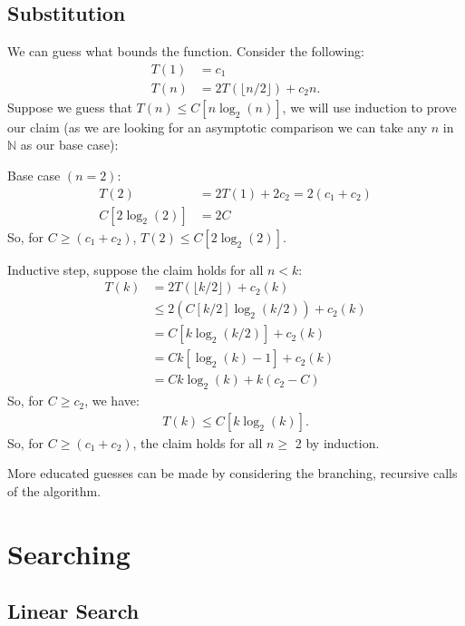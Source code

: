 \documentclass[a4paper, 12pt, twoside]{article}
\begin{document}
\subsection{Substitution}

We can guess what bounds the function. Consider the following:
\begin{align*}
      T(1) &= c_1 \\
      T(n) &= 2T(\lfloor n / 2 \rfloor) + c_2n.
\end{align*}
Suppose we guess that $T(n) \leq C[n\log_2(n)]$, we will use induction
to prove our claim (as we are looking for an asymptotic comparison
we can take any $n$ in $\mathbb{N}$ as our base case):
\begin{center}
      Base case $(n = 2)$:
      \begin{align*}
            T(2) & = 2T(1) + 2c_2 = 2(c_1 + c_2) \\
            C[2\log_2(2)] & = 2C
      \end{align*} 
      So, for $C \geq (c_1 + c_2)$, $T(2) \leq C[2\log_2(2)]$.    
\end{center}
\begin{center}
      Inductive step, suppose the claim holds for all $n < k$:
      \begin{align*}
            T(k) & = 2T(\lfloor k / 2 \rfloor) + c_2(k) \\
            & \leq 2(C[k / 2]\log_2(k / 2)) + c_2(k) \\
            & = C[k\log_2(k / 2)] + c_2(k) \\
            & = Ck[\log_2(k) - 1] + c_2(k) \\
            & = Ck\log_2(k) + k(c_2 - C)
      \end{align*}
      So, for $C \geq c_2$, we have:
      \begin{align*}
            T(k) \leq C[k\log_2(k)].
      \end{align*}
      So, for $C \geq (c_1 + c_2)$, the claim holds for all $n \geq$ 2
      by induction.
\end{center}
More educated guesses can be made by considering the branching,
recursive calls of the algorithm.

\section{Searching}

\subsection{Linear Search}
\end{document}
